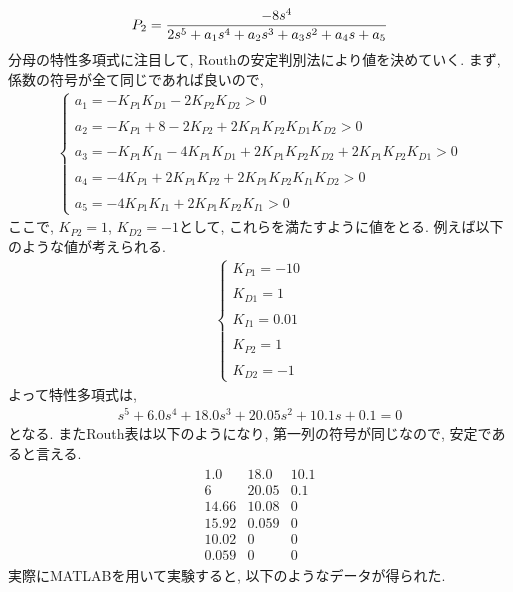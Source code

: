 \documentclass[12pt]{jsarticle}   	%
\begin{document}
\begin{eqnarray}
\tiny{P_2 = \frac{-8s^4}{2s^5 + a_1 s^4 + a_2 s^3 + a_3 s^2 + a_4 s + a_5}}
\end{eqnarray}
\newline
分母の特性多項式に注目して, Routhの安定判別法により値を決めていく. まず, 係数の符号が全て同じであれば良いので, 
\begin{eqnarray}
\left\{
\begin{array}{l}
a_1 = -K_{P1}K_{D1} - 2K_{P2}K_{D2} > 0 \\ \\
a_2 = -K_{P1} + 8 - 2K_{P2} + 2K_{P1}K_{P2}K_{D1}K_{D2} > 0 \\ \\
a_3 = -K_{P1}K_{I1} - 4K_{P1}K_{D1} + 2K_{P1}K_{P2}K_{D2} + 2K_{P1}K_{P2}K_{D1} > 0 \\ \\
a_4 = -4K_{P1} + 2K_{P1}K_{P2} + 2K_{P1}K_{P2}K_{I1}K_{D2} > 0 \\ \\
a_5 = -4K_{P1}K_{I1} + 2K_{P1}K_{P2}K_{I1} > 0
\end{array}
\right.
\end{eqnarray}
ここで, $K_{P2} = 1$, $K_{D2} = -1$として, これらを満たすように値をとる. 例えば以下のような値が考えられる. 
\begin{eqnarray}
\left\{
\begin{array}{l}
K_{P1} = -10\\ \\
K_{D1} = 1\\ \\
K_{I1} = 0.01\\ \\
K_{P2} = 1\\ \\
K_{D2} = -1
\end{array}
\right.
\end{eqnarray}
\noindent
よって特性多項式は, 
\begin{eqnarray}
s^5 + 6.0 s^4 + 18.0s^3 + 20.05s^2 + 10.1s + 0.1 = 0
\end{eqnarray}
となる.
\noindent
またRouth表は以下のようになり, 第一列の符号が同じなので, 安定であると言える.
\begin{eqnarray}
\begin{matrix}
1.0 & 18.0 & 10.1 \\
6 & 20.05 & 0.1 \\
14.66 & 10.08 & 0 \\
15.92 & 0.059 & 0 \\
10.02 & 0 & 0 \\
0.059 & 0 & 0 
\end{matrix}
\end{eqnarray}
\noindent
実際にMATLABを用いて実験すると, 以下のようなデータが得られた.
\end{document}
